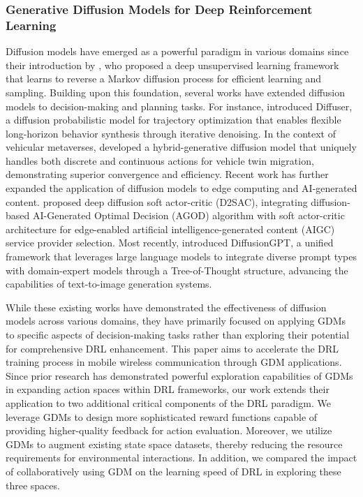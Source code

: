 \documentclass[comsoc,journal]{IEEEtran}
\begin{document}
\subsubsection{Generative Diffusion Models for Deep Reinforcement Learning}
Diffusion models have emerged as a powerful paradigm in various domains since their introduction by \cite{sohl2015deep}, who proposed a deep unsupervised learning framework that learns to reverse a Markov diffusion process for efficient learning and sampling. Building upon this foundation, several works have extended diffusion models to decision-making and planning tasks. For instance, \cite{janner2022planning} introduced Diffuser, a diffusion probabilistic model for trajectory optimization that enables flexible long-horizon behavior synthesis through iterative denoising. In the context of vehicular metaverses, \cite{kang2024hybrid} developed a hybrid-generative diffusion model that uniquely handles both discrete and continuous actions for vehicle twin migration, demonstrating superior convergence and efficiency. Recent work has further expanded the application of diffusion models to edge computing and AI-generated content. \cite{du2024diffusion} proposed deep diffusion soft actor-critic (D2SAC), integrating diffusion-based AI-Generated Optimal Decision (AGOD) algorithm with soft actor-critic architecture for edge-enabled artificial intelligence-generated content (AIGC) service provider selection. Most recently, \cite{qin2024diffusiongpt} introduced DiffusionGPT, a unified framework that leverages large language models to integrate diverse prompt types with domain-expert models through a Tree-of-Thought structure, advancing the capabilities of text-to-image generation systems. 



While these existing works have demonstrated the effectiveness of diffusion models across various domains, they have primarily focused on applying GDMs to specific aspects of decision-making tasks rather than exploring their potential for comprehensive DRL enhancement. This paper aims to accelerate the DRL training process in mobile wireless communication through GDM applications. Since prior research has demonstrated powerful exploration capabilities of GDMs in expanding action spaces within DRL frameworks, our work extends their application to two additional critical components of the DRL paradigm. We leverage GDMs to design more sophisticated reward functions capable of providing higher-quality feedback for action evaluation. Moreover, we utilize GDMs to augment existing state space datasets, thereby reducing the resource requirements for environmental interactions. In addition, we compared the impact of collaboratively using GDM on the learning speed of DRL in exploring these three spaces.
\end{document}

